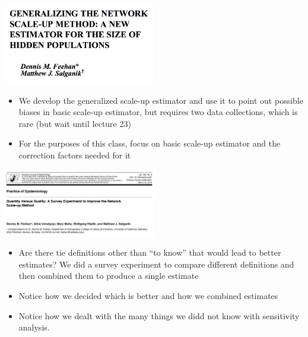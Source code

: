 \documentclass[aspectratio=169]{beamer}
\begin{document}
\begin{frame}

\begin{center}
\includegraphics[width=0.5\textwidth]{figures/feehan_generalizing_2016_title}
\end{center}

\begin{itemize}
\item We develop the generalized scale-up estimator and use it to point out possible biases in basic scale-up estimator, but requires two data collections, which is rare (but wait until lecture 23) \pause
\item For the purposes of this class, focus on basic scale-up estimator and the correction factors needed for it
\end{itemize}

\end{frame}
\begin{frame}

\begin{center}
\includegraphics[width=0.5\textwidth]{figures/feehan_quantity_2016_title}
\end{center}

\begin{itemize}
\item Are there tie definitions other than ``to know'' that would lead to better estimates? We did a survey experiment to compare different definitions and then combined them to produce a single estimate \pause
\item Notice how we decided which is better and how we combined estimates \pause
\item Notice how we dealt with the many things we didd not know with sensitivity analysis. \pause
\end{itemize}

\end{frame}
\end{document}
